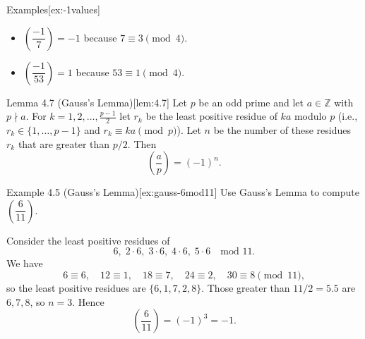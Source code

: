 \documentclass[10pt]{article}
\theoremstyle{definition}
\theoremstyle{plain}
\numberwithin{equation}{section}
\begin{document}
\begin{define}{Examples}[ex:-1values]
\begin{itemize}
  \item $\left(\dfrac{-1}{7}\right)=-1$ because $7\equiv 3\pmod 4$.
  \item $\left(\dfrac{-1}{53}\right)=1$ because $53\equiv 1\pmod 4$.
\end{itemize}
\end{define}

\bigskip

\begin{define}{Lemma 4.7 (Gauss's Lemma)}[lem:4.7]
Let $p$ be an odd prime and let $a\in\mathbb{Z}$ with $p\nmid a$. For $k=1,2,\dots,\frac{p-1}{2}$ let $r_k$ be the least positive residue of $ka$ modulo $p$ (i.e., $r_k\in\{1,\dots,p-1\}$ and $r_k\equiv ka\pmod p$). Let $n$ be the number of these residues $r_k$ that are greater than $p/2$. Then
\[
\left(\frac{a}{p}\right)=(-1)^n.
\]
\end{define}

\begin{define}{Example 4.5 (Gauss's Lemma)}[ex:gauss-6mod11]
Use Gauss's Lemma to compute $\left(\dfrac{6}{11}\right)$.

Consider the least positive residues of
\[
6,\;2\cdot6,\;3\cdot6,\;4\cdot6,\;5\cdot6
\quad\text{mod }11.
\]
We have
\[
6\equiv 6,\quad 12\equiv 1,\quad 18\equiv 7,\quad 24\equiv 2,\quad 30\equiv 8 \pmod{11},
\]
so the least positive residues are $\{6,1,7,2,8\}$. Those greater than $11/2=5.5$ are $6,7,8$, so $n=3$. Hence
\[
\left(\frac{6}{11}\right)=(-1)^3=-1.
\]
\end{define}











\newpage
\end{document}
